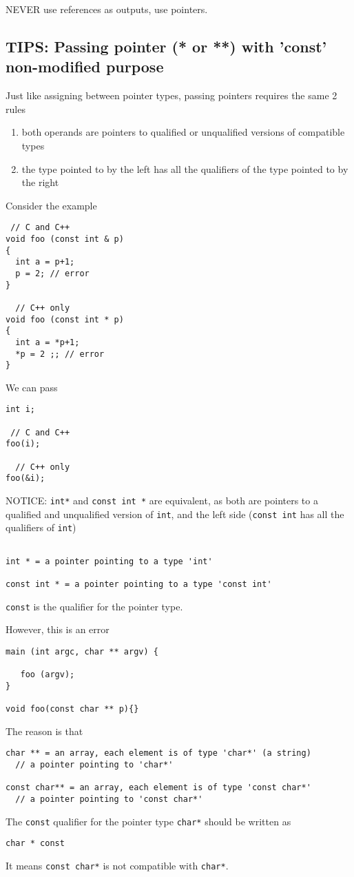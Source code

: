 NEVER use references as outputs, use pointers.


\subsection{TIPS: Passing pointer (* or **) with 'const' non-modified purpose}

Just like assigning between pointer types, passing pointers requires the same
2 rules
\begin{enumerate}
  \item both operands are pointers to qualified or unqualified versions of
  compatible types
  
  \item the type pointed to by the left has all the qualifiers of the type
  pointed to by the right
\end{enumerate}

Consider the example
\begin{verbatim}
 // C and C++ 
void foo (const int & p)
{
  int a = p+1;
  p = 2; // error
}

  // C++ only
void foo (const int * p)
{
  int a = *p+1;
  *p = 2 ;; // error
}
\end{verbatim}

We can pass
\begin{verbatim}
int i;

 // C and C++
foo(i);

  // C++ only
foo(&i);
\end{verbatim}
NOTICE: \verb!int*! and \verb!const int *! are equivalent, as both are pointers
to a qualified and unqualified version of \verb!int!, and the left side
(\verb!const int! has all the qualifiers of \verb!int!)
\begin{verbatim}

int * = a pointer pointing to a type 'int'

const int * = a pointer pointing to a type 'const int' 
\end{verbatim}
\verb!const! is the qualifier for the pointer type.


However, this is an error
\begin{verbatim}
main (int argc, char ** argv) {

   foo (argv);
}

void foo(const char ** p){} 
\end{verbatim}
The reason is that 
\begin{verbatim}
char ** = an array, each element is of type 'char*' (a string)
  // a pointer pointing to 'char*' 
 
const char** = an array, each element is of type 'const char*'
  // a pointer pointing to 'const char*' 
\end{verbatim}
The \verb!const! qualifier for the pointer type \verb!char*! should be written
as
\begin{verbatim}
char * const
\end{verbatim}
It means \verb!const char*! is not compatible with \verb!char*!.

